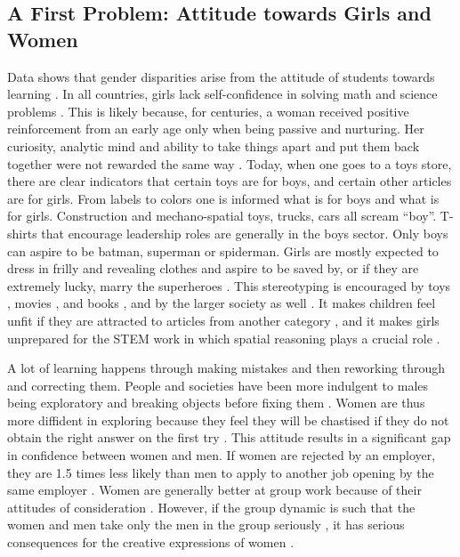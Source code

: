 \documentclass[utf8]{frontiersSCNS} %
\begin{document}
\subsection{A First Problem: Attitude towards Girls and Women}
\label{Sec2}
 Data shows that gender disparities arise from the attitude of students towards learning \citep{organisation2015abc}. In all countries, girls lack self-confidence in solving math and science problems \citep{organisation2015abc}. This is likely because, for centuries, a woman received positive reinforcement from an early age only when being passive and nurturing. Her curiosity, analytic mind and ability to take things apart and put them back together were not rewarded the same way \citep{signorella1987children, francis2010gender, organisation2015abc, KSmith}. Today, when one goes to a toys store, there are clear indicators that certain toys are for boys, and certain other articles are for girls. From labels to colors one is informed what is for boys and what is for girls. Construction and mechano-spatial toys, trucks, cars all scream “boy”. T-shirts that encourage leadership roles are generally in the boys sector. Only boys can aspire to be batman, superman or spiderman. Girls are mostly expected to dress in frilly and revealing clothes and aspire to be saved by, or if they are extremely lucky, marry the superheroes \citep{graff2012too}. This stereotyping is encouraged by toys \citep{francis2010gender,KSmith}, movies \citep{bleakley2012trends}, and books \citep{caldwell2018hairdressing, barrs2000gendered,hamilton2006gender,frawley2008gender}, and by the larger society as well \citep{KSmith, witt2010self}. It makes children feel unfit if they are attracted to articles from another category \citep{KSmith,cvencek2011math}, and it makes girls unprepared for the STEM work in which spatial reasoning plays a crucial role \citep{taylor2013think3d,casey2015longitudinal}. 
 
 A lot of learning happens through making mistakes and then reworking through and correcting them. People and societies have been more indulgent to males being exploratory and breaking objects before fixing them \citep{francis2010gender}.  Women are thus more diffident in exploring because they feel they will be chastised if they do not obtain the right answer on the first try \citep{organisation2015abc, KSmith}. This attitude  results in a significant gap in confidence between women and men.  If women are rejected by an employer, they are 1.5 times less likely than men to apply to another job opening by the same employer \citep{brands2017leaning}. Women are generally better at group work because of their attitudes of consideration \citep{Yardi}. However, if the group dynamic is such that the women and men take only the men in the group seriously \citep{Guardian}, it has serious consequences for the creative expressions of women \citep{pollack2013there,corbett2015solving}.
\end{document}
